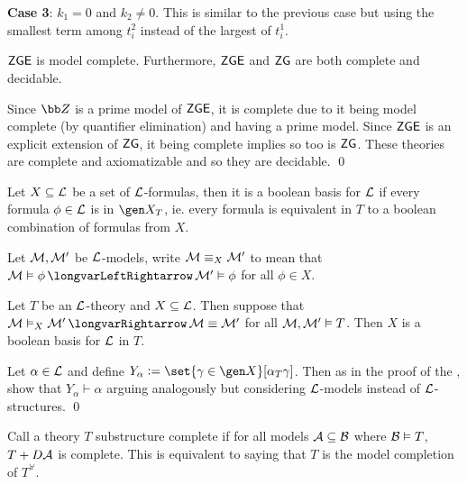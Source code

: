     {\bf Case 3}: $k_1=0$ and $k_2\neq0$.
    This is similar to the previous case but using the smallest term among $t_i^2$ instead of the largest of $t_i^1$.

\eexam

\bcoro

    ${\sf ZGE}$ is model complete.
    Furthermore, ${\sf ZGE}$ and ${\sf ZG}$ are both complete and decidable.

\ecoro

Since ${\bb Z}$ is a prime model of ${\sf ZGE}$, it is complete due to it being model complete (by quantifier elimination) and having a prime model.
Since ${\sf ZGE}$ is an explicit extension of ${\sf ZG}$, it being complete implies so too is ${\sf ZG}$.
These theories are complete and axiomatizable and so they are decidable.
\qed

\bdefn

    Let $X\subseteq{\cal L}$ be a set of ${\cal L}$-formulas, then it is a {\emphcolor boolean basis} for ${\cal L}$ if every formula $\phi\in{\cal L}$ is in $\gen X_T$, ie. every
    formula is equivalent in $T$ to a boolean combination of formulas from $X$.

\edefn

Let ${\cal M},{\cal M}'$ be ${\cal L}$-models, write ${\cal M}\equiv_X{\cal M}'$ to mean that ${\cal M}\vDash\phi\iff{\cal M}'\vDash\phi$ for all $\phi\in X$.

\bthrm[title=Basis Theorem for Formulas, name=formulabasistheorem]

    Let $T$ be an ${\cal L}$-theory and $X\subseteq{\cal L}$.
    Then suppose that ${\cal M}\vDash_X{\cal M}'\implies{\cal M}\equiv{\cal M}'$ for all ${\cal M},{\cal M}'\vDash T$.
    Then $X$ is a boolean basis for ${\cal L}$ in $T$.

\ethrm

Let $\alpha\in{\cal L}$ and define $Y_\alpha\coloneqq\set{\gamma\in\gen X}[\alpha_T\gamma]$.
Then as in the proof of the , show that $Y_\alpha\vdash\alpha$ arguing analogously but considering ${\cal L}$-models instead of ${\cal L}$-structures.
\qed

\bdefn

    Call a theory $T$ {\emphcolor substructure complete} if for all models ${\cal A}\subseteq{\cal B}$ where ${\cal B}\vDash T$, $T+D{\cal A}$ is complete.
    This is equivalent to saying that $T$ is the model completion of $T^\forall$.

